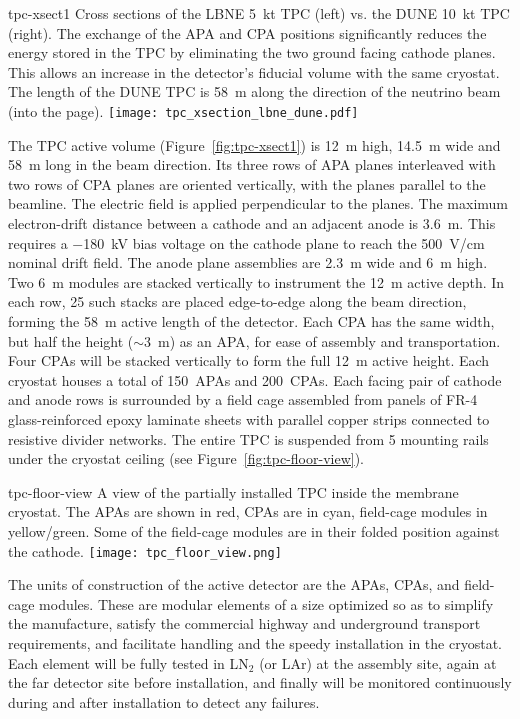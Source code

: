 \begin{cdrfigure}{tpc-xsect1}
{Cross sections of the LBNE 5~kt TPC (left) vs. the DUNE 10~kt TPC (right).  
The exchange of the APA and CPA positions significantly reduces the energy 
stored in the TPC by eliminating the two ground facing cathode planes. 
This allows an increase in the detector's fiducial volume with the same cryostat.  
The length of the DUNE TPC is  58~m along the direction of the neutrino beam (into the page).}
\texttt{[image: tpc\_xsection\_lbne\_dune.pdf]}
\end{cdrfigure}
The TPC active volume (Figure~\ref{fig:tpc-xsect1}) is 12~m high,
14.5~m wide and 58~m long in the beam direction.  
Its three rows of APA planes interleaved with two rows of CPA planes
are oriented vertically, with the planes parallel to the beamline. The
electric field is applied perpendicular to the planes.  The maximum
electron-drift distance between a cathode and an adjacent anode is
3.6~m. This requires a $-$180~kV bias voltage on the cathode plane to
reach the 500~V/cm nominal drift field. The anode plane assemblies are
2.3~m wide and 6~m high. Two 6~m modules are stacked vertically to
instrument the 12~m active depth. In each row, 25 such stacks are
placed edge-to-edge along the beam direction, forming the 58~m active
length of the detector.  Each CPA has the same width, but half the
height ($\sim$3~m) as an APA, for ease of assembly and transportation.
Four CPAs will be stacked vertically to form the full 12~m active
height.  Each cryostat houses a total of 150~APAs and 200~CPAs.  Each
facing pair of cathode and anode rows is surrounded by a field
cage assembled from panels of FR-4 glass-reinforced epoxy laminate
sheets with parallel copper strips connected to resistive divider
networks.  The entire TPC is suspended from 5 mounting rails under the
cryostat ceiling (see Figure~\ref{fig:tpc-floor-view}).
\begin{cdrfigure}{tpc-floor-view}
{A view of the partially installed TPC inside the membrane cryostat.
  The APAs are shown in red, CPAs are in cyan, field-cage modules in
  yellow/green.  Some of the field-cage modules are in their folded
  position against the cathode.}
\texttt{[image: tpc\_floor\_view.png]}
\end{cdrfigure}

The units of construction of the active detector are the APAs, CPAs,
and field-cage modules. These are modular elements of a size optimized
so as to simplify the manufacture, satisfy the commercial highway and
underground transport requirements, and facilitate handling and the
speedy installation in the cryostat.  Each element will be fully
tested in LN$_2$ (or LAr) at the assembly site, again at the far
detector site before installation, and finally will be monitored
continuously during and after installation to detect any failures.


